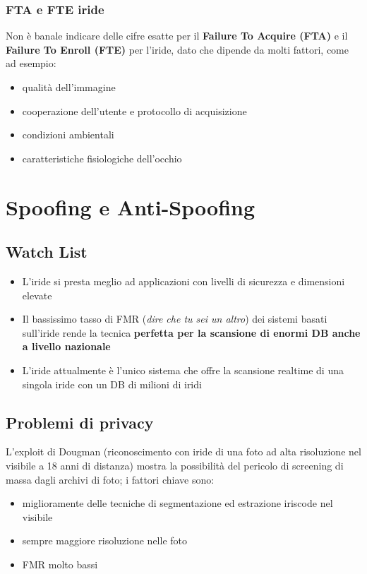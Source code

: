 \documentclass{report}
\begin{document}
\subsection{FTA e FTE iride}
Non è banale indicare delle cifre esatte per il \textbf{Failure To Acquire (FTA)}
e il \textbf{Failure To Enroll (FTE)} per l'iride, dato che dipende da molti 
fattori, come ad esempio:
\begin{itemize}
    \item qualità dell'immagine 
    \item cooperazione dell'utente e protocollo di acquisizione 
    \item condizioni ambientali 
    \item caratteristiche fisiologiche dell'occhio 
\end{itemize}

\chapter{Spoofing e Anti-Spoofing}

\section{Watch List}
\begin{itemize}
    \item L'iride si presta meglio ad applicazioni con livelli di sicurezza e dimensioni elevate 
    \item Il bassissimo tasso di FMR (\textit{dire che tu sei un altro}) dei sistemi basati sull'iride 
    rende la tecnica \textbf{perfetta per la scansione di enormi DB anche a livello nazionale}
    \item L'iride attualmente è l'unico sistema che offre la scansione realtime di una singola iride con un DB di 
    milioni di iridi
\end{itemize}

\section{Problemi di privacy}
L'exploit di Dougman (riconoscimento con iride di una foto ad alta risoluzione 
nel visibile a 18 anni di distanza) mostra la possibilità del pericolo di 
screening di massa dagli archivi di foto;
i fattori chiave sono:
\begin{itemize}
    \item miglioramente delle tecniche di segmentazione ed estrazione iriscode 
    nel visibile 
    \item sempre maggiore risoluzione nelle foto 
    \item FMR molto bassi 
\end{itemize}
\end{document}
